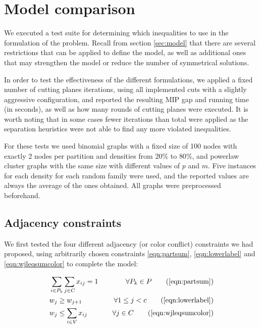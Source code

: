 
\section{Model comparison}

We executed a test suite for determining which inequalities to use in the formulation of the problem. Recall from section \ref{sec:model} that there are several restrictions that can be applied to define the model, as well as additional ones that may strengthen the model or reduce the number of symmetrical solutions.

In order to test the effectiveness of the different formulations, we applied a fixed number of cutting planes iterations, using all implemented cuts with a slightly aggressive configuration, and reported the resulting MIP gap and running time (in seconds), as well as how many rounds of cutting planes were executed. It is worth noting that in some cases fewer iterations than total were applied as the separation heuristics were not able to find any more violated inequalities.

For these tests we used binomial graphs with a fixed size of 100 nodes with exactly 2 nodes per partition and densities from $20\%$ to $80\%$, and powerlaw cluster graphs with the same size with different values of $p$ and $m$. Five instances for each density for each random family were used, and the reported values are always the average of the ones obtained. All graphs were preprocessed beforehand.

\subsection{Adjacency constraints}

We first tested the four different adjacency (or color conflict) constraints we had proposed, using arbitrarily chosen constraints \ref{eqn:partsum}, \ref{eqn:lowerlabel} and \ref{eqn:wjleqsumcolor} to complete the model:

\begin{align*}
&\sum_{i \in P_k} \sum_{j \in C} x_{ij} = 1 &\quad \forall P_k \in P \tag{\ref{eqn:partsum}} \\
&w_j \geq w_{j+1} &\quad \forall 1 \leq j < c \tag{\ref{eqn:lowerlabel}} \\
&w_j \leq \sum_{i \in V} x_{ij} &\quad \forall j \in C \tag{\ref{eqn:wjleqsumcolor}} \\
\end{align*}

